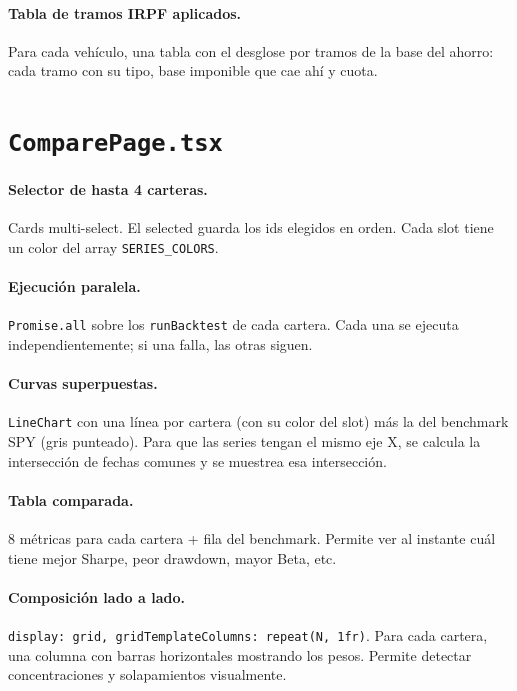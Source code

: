 \documentclass[11pt,a4paper]{book}
\begin{document}
\paragraph{Tabla de tramos IRPF aplicados.} Para cada vehículo, una tabla con el desglose por tramos de la base del ahorro: cada tramo con su tipo, base imponible que cae ahí y cuota.

\section{\texttt{ComparePage.tsx}}

\paragraph{Selector de hasta 4 carteras.} Cards multi-select. El selected guarda los ids elegidos en orden. Cada slot tiene un color del array \texttt{SERIES\_COLORS}.

\paragraph{Ejecución paralela.} \texttt{Promise.all} sobre los \texttt{runBacktest} de cada cartera. Cada una se ejecuta independientemente; si una falla, las otras siguen.

\paragraph{Curvas superpuestas.} \texttt{LineChart} con una línea por cartera (con su color del slot) más la del benchmark SPY (gris punteado). Para que las series tengan el mismo eje X, se calcula la intersección de fechas comunes y se muestrea esa intersección.

\paragraph{Tabla comparada.} 8 métricas para cada cartera + fila del benchmark. Permite ver al instante cuál tiene mejor Sharpe, peor drawdown, mayor Beta, etc.

\paragraph{Composición lado a lado.} \texttt{display: grid, gridTemplateColumns: repeat(N, 1fr)}. Para cada cartera, una columna con barras horizontales mostrando los pesos. Permite detectar concentraciones y solapamientos visualmente.
\end{document}
